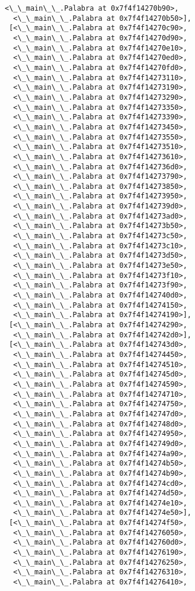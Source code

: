 \documentclass[12pt,a4paper,table]{article}
\begin{document}
\begin{tcolorbox}[breakable, size=fbox, boxrule=.5pt, pad at break*=1mm, opacityfill=0]
\begin{Verbatim}[commandchars=\\\{\}]
  <\_\_main\_\_.Palabra at 0x7f4f14270b90>,
  <\_\_main\_\_.Palabra at 0x7f4f14270b50>],
 [<\_\_main\_\_.Palabra at 0x7f4f14270c90>,
  <\_\_main\_\_.Palabra at 0x7f4f14270d90>,
  <\_\_main\_\_.Palabra at 0x7f4f14270e10>,
  <\_\_main\_\_.Palabra at 0x7f4f14270ed0>,
  <\_\_main\_\_.Palabra at 0x7f4f14270fd0>,
  <\_\_main\_\_.Palabra at 0x7f4f14273110>,
  <\_\_main\_\_.Palabra at 0x7f4f14273190>,
  <\_\_main\_\_.Palabra at 0x7f4f14273290>,
  <\_\_main\_\_.Palabra at 0x7f4f14273350>,
  <\_\_main\_\_.Palabra at 0x7f4f14273390>,
  <\_\_main\_\_.Palabra at 0x7f4f14273450>,
  <\_\_main\_\_.Palabra at 0x7f4f14273550>,
  <\_\_main\_\_.Palabra at 0x7f4f14273510>,
  <\_\_main\_\_.Palabra at 0x7f4f14273610>,
  <\_\_main\_\_.Palabra at 0x7f4f142736d0>,
  <\_\_main\_\_.Palabra at 0x7f4f14273790>,
  <\_\_main\_\_.Palabra at 0x7f4f14273850>,
  <\_\_main\_\_.Palabra at 0x7f4f14273950>,
  <\_\_main\_\_.Palabra at 0x7f4f142739d0>,
  <\_\_main\_\_.Palabra at 0x7f4f14273ad0>,
  <\_\_main\_\_.Palabra at 0x7f4f14273b50>,
  <\_\_main\_\_.Palabra at 0x7f4f14273c50>,
  <\_\_main\_\_.Palabra at 0x7f4f14273c10>,
  <\_\_main\_\_.Palabra at 0x7f4f14273d50>,
  <\_\_main\_\_.Palabra at 0x7f4f14273e50>,
  <\_\_main\_\_.Palabra at 0x7f4f14273f10>,
  <\_\_main\_\_.Palabra at 0x7f4f14273f90>,
  <\_\_main\_\_.Palabra at 0x7f4f142740d0>,
  <\_\_main\_\_.Palabra at 0x7f4f14274150>,
  <\_\_main\_\_.Palabra at 0x7f4f14274190>],
 [<\_\_main\_\_.Palabra at 0x7f4f14274290>,
  <\_\_main\_\_.Palabra at 0x7f4f142742d0>],
 [<\_\_main\_\_.Palabra at 0x7f4f142743d0>,
  <\_\_main\_\_.Palabra at 0x7f4f14274450>,
  <\_\_main\_\_.Palabra at 0x7f4f14274510>,
  <\_\_main\_\_.Palabra at 0x7f4f142745d0>,
  <\_\_main\_\_.Palabra at 0x7f4f14274590>,
  <\_\_main\_\_.Palabra at 0x7f4f14274710>,
  <\_\_main\_\_.Palabra at 0x7f4f14274750>,
  <\_\_main\_\_.Palabra at 0x7f4f142747d0>,
  <\_\_main\_\_.Palabra at 0x7f4f142748d0>,
  <\_\_main\_\_.Palabra at 0x7f4f14274950>,
  <\_\_main\_\_.Palabra at 0x7f4f142749d0>,
  <\_\_main\_\_.Palabra at 0x7f4f14274a90>,
  <\_\_main\_\_.Palabra at 0x7f4f14274b50>,
  <\_\_main\_\_.Palabra at 0x7f4f14274b90>,
  <\_\_main\_\_.Palabra at 0x7f4f14274cd0>,
  <\_\_main\_\_.Palabra at 0x7f4f14274d50>,
  <\_\_main\_\_.Palabra at 0x7f4f14274e10>,
  <\_\_main\_\_.Palabra at 0x7f4f14274e50>],
 [<\_\_main\_\_.Palabra at 0x7f4f14274f50>,
  <\_\_main\_\_.Palabra at 0x7f4f14276050>,
  <\_\_main\_\_.Palabra at 0x7f4f142760d0>,
  <\_\_main\_\_.Palabra at 0x7f4f14276190>,
  <\_\_main\_\_.Palabra at 0x7f4f14276250>,
  <\_\_main\_\_.Palabra at 0x7f4f14276310>,
  <\_\_main\_\_.Palabra at 0x7f4f14276410>,

\end{Verbatim}
\end{tcolorbox}
\end{document}
